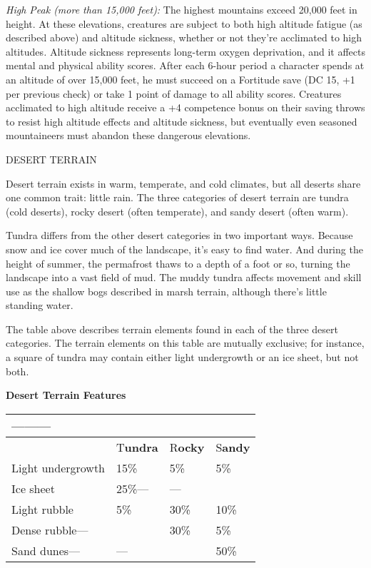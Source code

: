 \documentclass{article}
\begin{document}
\textit{High Peak (more than 15,000 feet): }The highest mountains exceed 20,000 
feet in height. At these elevations, creatures are subject to both high altitude 
fatigue (as described above) and altitude sickness, whether or not they're acclimated 
to high altitudes\textit{. }Altitude sickness represents long-term oxygen deprivation, 
and it affects mental and physical ability scores. After each 6-hour period a character 
spends at an altitude of over 15,000 feet, he must succeed on a Fortitude save 
(DC 15, +1 per previous check) or take 1 point of damage to all ability scores. 
Creatures acclimated to high altitude receive a +4 competence bonus on their saving 
throws to resist high altitude effects and altitude sickness, but eventually even 
seasoned mountaineers must abandon these dangerous elevations. 

\vspace{12pt}
DESERT TERRAIN

Desert terrain exists in warm, temperate, and cold climates, but all deserts share 
one common trait: little rain. The three categories of desert terrain are tundra 
(cold deserts), rocky desert (often temperate), and sandy desert (often warm).

Tundra differs from the other desert categories in two important ways. Because 
snow and ice cover much of the landscape, it's easy to find water. And during the 
height of summer, the permafrost thaws to a depth of a foot or so, turning the 
landscape into a vast field of mud. The muddy tundra affects movement and skill 
use as the shallow bogs described in marsh terrain, although there's little standing 
water.

The table above describes terrain elements found in each of the three desert categories. 
The terrain elements on this table are mutually exclusive; for instance, a square 
of tundra may contain either light undergrowth or an ice sheet, but not both.

\textbf{Desert Terrain Features}

\begin{tabular}{|>{\raggedright}p{74pt}|>{\raggedright}p{41pt}|>{\raggedright}p{34pt}|>{\raggedright}p{33pt}|}
\hline
 --------- & \multicolumn{3}{p{109pt}|}{ \textbf{Desert Category ---------}}\tabularnewline
\hline
  & T\textbf{undra} & R\textbf{ocky} & S\textbf{andy}\tabularnewline
\hline
Light undergrowth & 15\% & 5\% & 5\%\tabularnewline
\hline
Ice sheet & 25\%--- & --- & \tabularnewline
\hline
Light rubble & 5\% & 30\% & 10\%\tabularnewline
\hline
Dense rubble--- &  & 30\% & 5\%\tabularnewline
\hline
Sand dunes--- & --- &  & 50\%\tabularnewline
\hline
\end{tabular}
\end{document}
